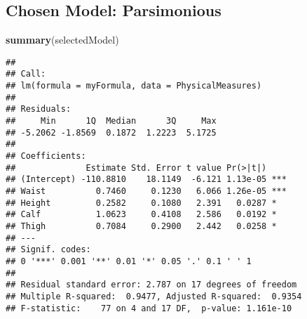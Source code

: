 \documentclass[]{article}
\newenvironment{Shaded}{\begin{snugshade}}{\end{snugshade}}
\newcommand{\KeywordTok}[1]{\textcolor[rgb]{0.13,0.29,0.53}{\textbf{#1}}}
\newcommand{\NormalTok}[1]{#1}
\begin{document}
\subsection{Chosen Model: Parsimonious}\label{chosen-model-parsimonious}

\begin{Shaded}
\begin{Highlighting}[]
\KeywordTok{summary}\NormalTok{(selectedModel)}
\end{Highlighting}
\end{Shaded}

\begin{verbatim}
## 
## Call:
## lm(formula = myFormula, data = PhysicalMeasures)
## 
## Residuals:
##     Min      1Q  Median      3Q     Max 
## -5.2062 -1.8569  0.1872  1.2223  5.1725 
## 
## Coefficients:
##              Estimate Std. Error t value Pr(>|t|)    
## (Intercept) -110.8810    18.1149  -6.121 1.13e-05 ***
## Waist          0.7460     0.1230   6.066 1.26e-05 ***
## Height         0.2582     0.1080   2.391   0.0287 *  
## Calf           1.0623     0.4108   2.586   0.0192 *  
## Thigh          0.7084     0.2900   2.442   0.0258 *  
## ---
## Signif. codes:  
## 0 '***' 0.001 '**' 0.01 '*' 0.05 '.' 0.1 ' ' 1
## 
## Residual standard error: 2.787 on 17 degrees of freedom
## Multiple R-squared:  0.9477, Adjusted R-squared:  0.9354 
## F-statistic:    77 on 4 and 17 DF,  p-value: 1.161e-10
\end{verbatim}
\end{document}
